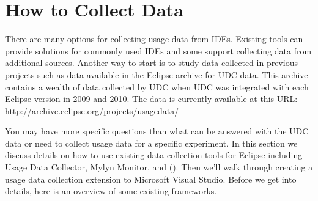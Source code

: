 \section{How to Collect Data}
\label{SecHowToCollectData}

There are many options for collecting usage data from IDEs.   Existing tools can provide solutions for commonly used IDEs and some support collecting data from additional sources.   Another way to start is to study data collected in previous projects such as data available in the Eclipse archive for UDC data.  This archive contains a wealth of data collected by UDC when UDC was integrated with each Eclipse version in 2009 and 2010.  The data is currently available at this URL:
\url{http://archive.eclipse.org/projects/usagedata/}

You may have more specific questions than what can be answered with the UDC data or need to collect usage data for a specific experiment.  In this section we discuss details on how to use existing data collection tools for Eclipse including Usage Data Collector, Mylyn Monitor, and \CodingSpectator{} ().  Then we'll walk through creating a usage data collection extension to Microsoft Visual Studio.  Before we get into details, here is an overview of some existing frameworks.


